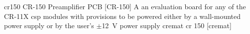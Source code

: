\newglsXequipment%
{cr150}%
{CR{\--}150 Preamplifier PCB}%
[CR{\--}150]%
{A an evaluation board for any of the CR-11X \gls{csp} modules with provisions to be powered either by a wall-mounted power supply or by the user's $\pm$\SI{12}{\volt} power supply}%
{cremat cr 150}%
[cremat]%